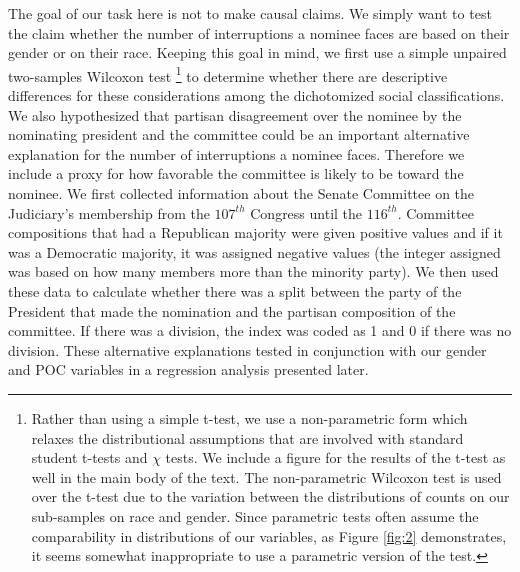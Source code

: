\documentclass [12pt]{article}
\begin{document}
The goal of our task here is not to make causal claims. We simply want to test the claim whether the number of interruptions a nominee faces are based on their gender or on their race. Keeping this goal in mind, we first use a simple unpaired two-samples Wilcoxon test \footnote{Rather than using a simple t-test, we use a non-parametric form which relaxes the distributional assumptions that are involved with standard student t-tests and $\chi$ tests. We include a figure for the results of the t-test as well in the main body of the text. The non-parametric Wilcoxon test is used over the t-test due to the variation between the distributions of counts on our sub-samples on race and gender. Since parametric tests often assume the comparability in distributions of our variables, as Figure \ref{fig:2} demonstrates, it seems somewhat inappropriate to use a parametric version of the test.} to determine whether there are descriptive differences for these considerations among the dichotomized social classifications. We also hypothesized that partisan disagreement over the nominee by the nominating president and the committee could be an important alternative explanation for the number of interruptions a nominee faces. Therefore we include a proxy for how favorable the committee is likely to be toward the nominee. We first collected information about the Senate Committee on the Judiciary's membership from the $107^{th}$ Congress until the $116^{th}$. Committee compositions that had a Republican majority were given positive values and if it was a Democratic majority, it was assigned negative values (the integer assigned was based on how many members more than the minority party). We then used these data to calculate whether there was a split between the party of the President that made the nomination and the partisan composition of the committee. If there was a division, the index was coded as 1 and 0 if there was no division. These alternative explanations tested in conjunction with our gender and POC variables in a regression analysis presented later.
	    
\end{document}
